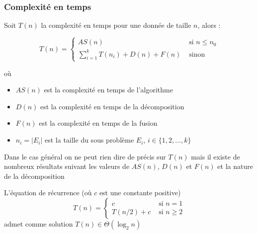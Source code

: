 \documentclass[aspectratio=1610,francais,envcountsect]{beamer}
\begin{document}
\begin{frame}[allowframebreaks]
  \frametitle{Complexité en temps}

  Soit $T(n)$ la complexité en temps pour une donnée de taille $n$,
  alors :

  \begin{equation}
    \label{eq:3}
    T(n) =
    \begin{cases}
      AS(n) & \text{ si } n \leq n_0\\
      \sum_{i=1}^k T(n_i) + D(n) + F(n) & \text{ sinon }
    \end{cases}
  \end{equation}
 
  où

  \begin{itemize}
  \item $AS(n)$ est la complexité en temps de l’algorithme
  \item $D(n)$ est la complexité en temps de la décomposition
  \item $F(n)$ est la complexité en temps de la fusion
  \item $n_i = |E_i|$ est la taille du sous problème $E_i$,
    $i \in\{1, 2, \ldots , k\}$
  \end{itemize}

  Dans le cas général on ne peut rien dire de précis sur $T(n)$ mais
  il existe de nombreux résultats suivant les valeurs de $AS(n)$,
  $D(n)$ et $F(n)$ et la nature de la décomposition \framebreak

  \begin{theorem}
    \label{thm:rec1}
    L’équation de récurrence (où $c$ est une constante positive)
    \begin{equation}
      \label{eq:5}
      T(n) = 
      \begin{cases}
        c & \text{ si } n = 1\\
        T(n/2) + c & \text { si } n \geq 2
      \end{cases}
    \end{equation}
    admet comme solution $T(n) \in \Theta(\log_2n)$
  \end{theorem}

  \framebreak


\end{frame}
\end{document}
